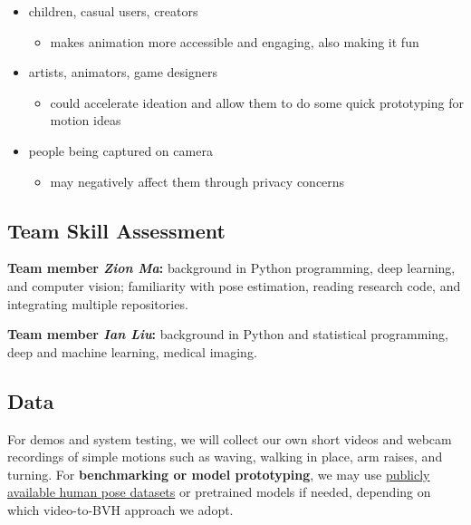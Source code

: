 \begin{itemize}
  \item children, casual users, creators
  \begin{itemize}
    \item makes animation more accessible and engaging, also making it fun
  \end{itemize}
  \item artists, animators, game designers
  \begin{itemize}
    \item could accelerate ideation and allow them to do some quick prototyping for motion ideas
  \end{itemize}
  \item people being captured on camera 
  \begin{itemize}
    \item may negatively affect them through privacy concerns
  \end{itemize}
\end{itemize}


\subsection*{Team Skill Assessment}

\textbf{Team member \textit{Zion Ma}:} background in Python programming, deep learning, and computer vision; familiarity with pose estimation, reading research code, and integrating multiple repositories.

\textbf{Team member \textit{Ian Liu}:} background in Python and statistical programming, deep and machine learning, medical imaging. 




\subsection*{Data}

For demos and system testing, we will collect our own short videos and webcam recordings of simple motions such as waving, walking in place, arm raises, and turning. For \textbf{benchmarking or model prototyping}, we may use \href{https://huggingface.co/datasets/keshan/amateur_drawings-controlnet-dataset}{publicly available human pose datasets} or pretrained models if needed, depending on which video-to-BVH approach we adopt. 


